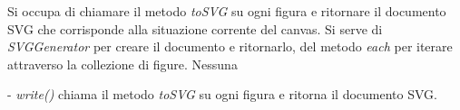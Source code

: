 Si occupa di chiamare il metodo \textit{toSVG} su ogni figura e ritornare il documento SVG che corrisponde alla situazione corrente del canvas.
Si serve di \textit{SVGGenerator} per creare il documento e ritornarlo, del metodo \textit{each} per iterare attraverso la collezione di figure.
Nessuna
\begin{elencopuntato}[\subsubsecindent]
\item[-]  \textit{write()} chiama il metodo \textit{toSVG} su ogni figura e ritorna il documento SVG.
\end{elencopuntato}

